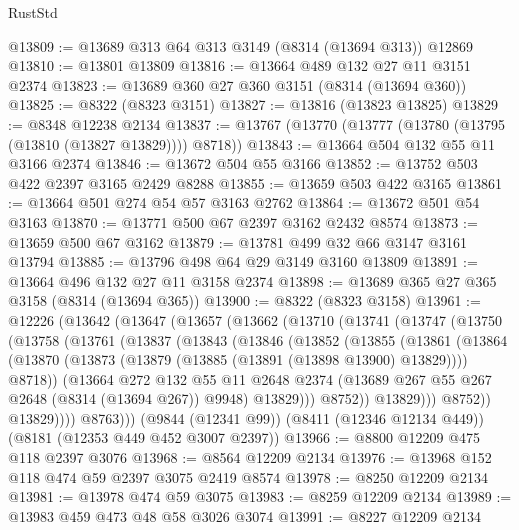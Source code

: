 \begin{lexlean}{RustStd}
\begin{coremodule}
@13809 := @13689 @313 @64 @313 @3149 (@8314 (@13694 @313)) @12869
@13810 := @13801 @13809
@13816 := @13664 @489 @132 @27 @11 @3151 @2374
@13823 := @13689 @360 @27 @360 @3151 (@8314 (@13694 @360))
@13825 := @8322 (@8323 @3151)
@13827 := @13816 (@13823 @13825)
@13829 := @8348 @12238 @2134
@13837 := @13767 (@13770 (@13777 (@13780 (@13795 (@13810 (@13827 @13829)))) @8718))
@13843 := @13664 @504 @132 @55 @11 @3166 @2374
@13846 := @13672 @504 @55 @3166
@13852 := @13752 @503 @422 @2397 @3165 @2429 @8288
@13855 := @13659 @503 @422 @3165
@13861 := @13664 @501 @274 @54 @57 @3163 @2762
@13864 := @13672 @501 @54 @3163
@13870 := @13771 @500 @67 @2397 @3162 @2432 @8574
@13873 := @13659 @500 @67 @3162
@13879 := @13781 @499 @32 @66 @3147 @3161 @13794
@13885 := @13796 @498 @64 @29 @3149 @3160 @13809
@13891 := @13664 @496 @132 @27 @11 @3158 @2374
@13898 := @13689 @365 @27 @365 @3158 (@8314 (@13694 @365))
@13900 := @8322 (@8323 @3158)
@13961 := @12226
    (@13642
      (@13647
        (@13657
          (@13662
            (@13710
              (@13741
                (@13747
                  (@13750
                    (@13758
                      (@13761
                        (@13837
                          (@13843
                            (@13846
                              (@13852
                                (@13855
                                  (@13861
                                    (@13864
                                      (@13870
                                        (@13873 (@13879 (@13885 (@13891 (@13898 @13900) @13829))))
                                        @8718))
                                    (@13664
                                      @272
                                      @132
                                      @55
                                      @11
                                      @2648
                                      @2374
                                      (@13689 @267 @55 @267 @2648 (@8314 (@13694 @267)) @9948)
                                      @13829)))
                                @8752))
                            @13829)))
                      @8752))
                  @13829))))
          @8763)))
    (@9844 (@12341 @99))
    (@8411 (@12346 @12134 @449))
    (@8181 (@12353 @449 @452 @3007 @2397))
@13966 := @8800 @12209 @475 @118 @2397 @3076
@13968 := @8564 @12209 @2134
@13976 := @13968 @152 @118 @474 @59 @2397 @3075 @2419 @8574
@13978 := @8250 @12209 @2134
@13981 := @13978 @474 @59 @3075
@13983 := @8259 @12209 @2134
@13989 := @13983 @459 @473 @48 @58 @3026 @3074
@13991 := @8227 @12209 @2134

\end{coremodule}
\end{lexlean}
